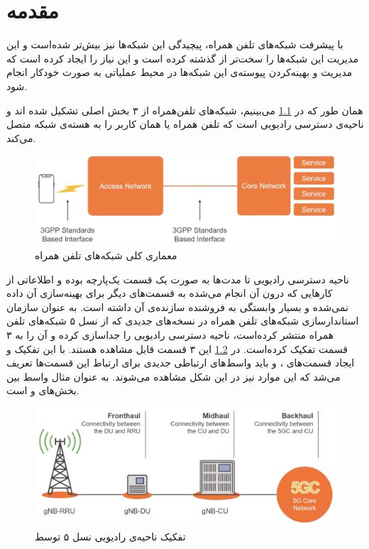 \chapter{مقدمه}
با پیشرفت شبکه‌های تلفن همراه، پیچیدگی این شبکه‌ها نیز بیش‌تر شده‌است و این مدیریت این شبکه‌ها را سخت‌تر از گذشته کرده ‌است و این نیاز را ایجاد کرده ‌است که مدیریت و بهینه‌کردن پیوسته‌ی این شبکه‌ها در محیط عملیاتی به صورت خودکار انجام شود. 

همان طور که در 
\ref{fig:ran}
می‌بینیم، شبکه‌های تلفن‌همراه از ۳ بخش اصلی تشکیل شده اند و ناحیه‌ی دسترسی رادیویی است که تلفن همراه یا همان کاربر را به هسته‌ی شبکه متصل می‌کند.
\begin{figure}[H]
	\includegraphics[width=0.85\columnwidth]{Picture/ran.png}
	\centering
	\caption{معماری کلی شبکه‌های تلفن همراه}
	\label{fig:ran}
\end{figure}

ناحیه دسترسی رادیویی تا مدت‌ها به صورت یک قسمت یک‌پارچه بوده و اطلاعاتی از کارهایی که درون آن انجام می‌شده به قسمت‌های دیگر برای بهینه‌سازی آن داده نمی‌شده و بسیار وابستگی به فروشنده
سازنده‌ی آن داشته است.
به عنوان سازمان استاندارسازی شبکه‌های تلفن همراه در نسخه‌های جدیدی که از نسل ۵ شبکه‌های تلفن همراه منتشر کرده‌است، ناحیه دسترسی رادیویی را جداسازی کرده و آن را به ۳ قسمت تفکیک کرده‌است. در 
\ref{fig:3gpp-ran}
این ۳ قسمت قابل مشاهده‌ هستند. با این تفکیک و ایجاد قسمت‌های 
،
و 
باید واسط‌های ارتباطی جدیدی برای ارتباط این قسمت‌ها تعریف می‌شد که این موارد نیز در این شکل مشاهده می‌شوند. به عنوان مثال 
واسط بین بخش‌های 
و 
است.
\begin{figure}[H]
	\includegraphics[width=0.85\columnwidth]{Picture/3gpp-ran.png}
	\centering
	\caption{تفکیک ناحیه‌ی رادیویی نسل ۵ توسط
	}
	\label{fig:3gpp-ran}
\end{figure}

